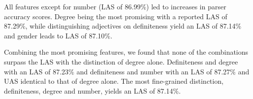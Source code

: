 \documentclass[11pt,a4paper]{article}
\begin{document}
All features except for number (LAS of 86.99\%) led to increases in parser
accuracy scores. Degree being the most promising with a reported LAS of
87.29\%, while distinguishing adjectives on definiteness yield an LAS of
87.14\% and gender leads to LAS of 87.10\%.

Combining the most promising features, we found that none of the combinations
surpass the LAS with the distinction of degree alone. Definiteness and degree
with an LAS of 87.23\% and definiteness and number with an LAS of 87.27\% and
UAS identical to that of degree alone. The most fine-grained distinction,
definiteness, degree and number, yields an LAS of 87.14\%.

\end{document}
